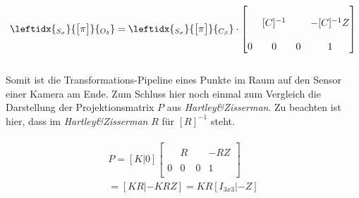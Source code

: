 		\begin{gather}
		\leftidx{_{S_\sigma}}{\begin{bmatrix}
			\pi
			\end{bmatrix}}{_{O_\delta}}
		=
		\leftidx{_{S_\sigma}}{\begin{bmatrix}
			\pi
			\end{bmatrix}}{_{C_\beta}}
		\cdot
		\begin{bmatrix}
		&&&\\
		&[C]^{-1}&& -[C]^{-1} Z\\
		&&&\\
		0&0&0&1\\
		\end{bmatrix}
		\end{gather}\\
		
	Somit ist die Transformations-Pipeline eines Punkte im Raum auf den Sensor einer Kamera am Ende. 
Zum Schluss hier noch einmal zum Vergleich die Darstellung der Projektionsmatrix $P$ aus \textit{Hartley\&Zisserman}\cite{HZ}. Zu beachten ist hier, dass im \textit{Hartley\&Zisserman} $R$ für $[R]^{-1}$ steht\cite{HZ}.
		
		\begin{gather}
		\begin{split}	
		P=
		[K|0] \begin{bmatrix}
		&&&\\
		&R&&-RZ\\
		&&&\\
		0&0&0&1\\
		\end{bmatrix}\\
		=[KR|-KRZ] 	= KR[I_{3x3}|-Z]
		\end{split}
		\end{gather}
